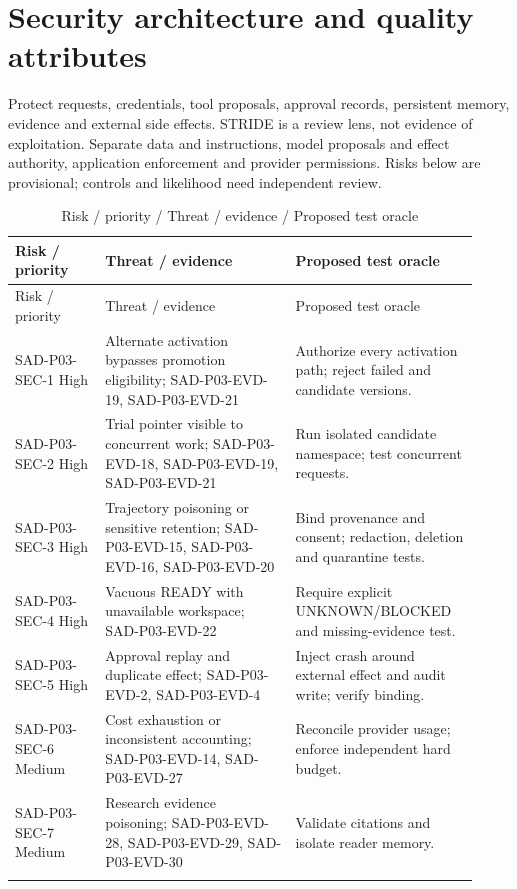 \documentclass[10pt,letterpaper]{article}
\begin{document}
\section{Security architecture and quality attributes}
Protect requests, credentials, tool proposals, approval records, persistent memory, evidence and external side effects. STRIDE is a review lens, not evidence of exploitation. Separate data and instructions, model proposals and effect authority, application enforcement and provider permissions. Risks below are provisional; controls and likelihood need independent review.
\begin{longtable}{@{}>{\raggedright\arraybackslash}p{0.18\linewidth}>{\raggedright\arraybackslash}p{0.38\linewidth}>{\raggedright\arraybackslash}p{0.36\linewidth}@{}}
\caption{Risk / priority / Threat / evidence / Proposed test oracle}\\
\toprule Risk / priority & Threat / evidence & Proposed test oracle\\\midrule\endfirsthead
\toprule Risk / priority & Threat / evidence & Proposed test oracle\\\midrule\endhead
SAD-P03-SEC-1 High & Alternate activation bypasses promotion eligibility; SAD-P03-EVD-19, SAD-P03-EVD-21 & Authorize every activation path; reject failed and candidate versions.\\\addlinespace
SAD-P03-SEC-2 High & Trial pointer visible to concurrent work; SAD-P03-EVD-18, SAD-P03-EVD-19, SAD-P03-EVD-21 & Run isolated candidate namespace; test concurrent requests.\\\addlinespace
SAD-P03-SEC-3 High & Trajectory poisoning or sensitive retention; SAD-P03-EVD-15, SAD-P03-EVD-16, SAD-P03-EVD-20 & Bind provenance and consent; redaction, deletion and quarantine tests.\\\addlinespace
SAD-P03-SEC-4 High & Vacuous READY with unavailable workspace; SAD-P03-EVD-22 & Require explicit UNKNOWN/BLOCKED and missing-evidence test.\\\addlinespace
SAD-P03-SEC-5 High & Approval replay and duplicate effect; SAD-P03-EVD-2, SAD-P03-EVD-4 & Inject crash around external effect and audit write; verify binding.\\\addlinespace
SAD-P03-SEC-6 Medium & Cost exhaustion or inconsistent accounting; SAD-P03-EVD-14, SAD-P03-EVD-27 & Reconcile provider usage; enforce independent hard budget.\\\addlinespace
SAD-P03-SEC-7 Medium & Research evidence poisoning; SAD-P03-EVD-28, SAD-P03-EVD-29, SAD-P03-EVD-30 & Validate citations and isolate reader memory.\\\addlinespace
\bottomrule\end{longtable}
\end{document}
